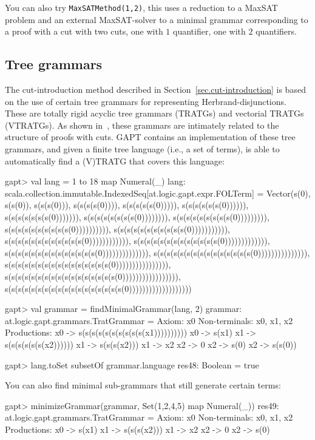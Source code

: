 \documentclass[a4paper,11pt]{article}
\begin{document}
You can also try \texttt{MaxSATMethod(1,2)}, this uses a reduction to a MaxSAT
problem and an external MaxSAT-solver to a
minimal grammar corresponding to a proof with a cut with two cuts, one with $1$
quantifier, one with $2$ quantifiers.

\subsection{Tree grammars}

The cut-introduction method described in Section~\ref{sec.cut-introduction} is
based on the use of certain tree grammars for representing Herbrand-disjunctions.
These are totally rigid acyclic tree grammars (TRATGs) and vectorial TRATGs (VTRATGs).
As shown in~\cite{Hetzl14Algorithmic}, these grammars are intimately related to
the structure of proofs with cuts.  GAPT contains an implementation of
these tree grammars, and given a finite tree language (i.e., a set of terms), is
able to automatically find a (V)TRATG that covers this language:

\begin{clilisting}
gapt> val lang = 1 to 18 map { Numeral(_) }
lang: scala.collection.immutable.IndexedSeq[at.logic.gapt.expr.FOLTerm] = Vector(s(0), s(s(0)), s(s(s(0))), s(s(s(s(0)))), s(s(s(s(s(0))))), s(s(s(s(s(s(0)))))), s(s(s(s(s(s(s(0))))))), s(s(s(s(s(s(s(s(0)))))))), s(s(s(s(s(s(s(s(s(0))))))))), s(s(s(s(s(s(s(s(s(s(0)))))))))), s(s(s(s(s(s(s(s(s(s(s(0))))))))))), s(s(s(s(s(s(s(s(s(s(s(s(0)))))))))))), s(s(s(s(s(s(s(s(s(s(s(s(s(0))))))))))))), s(s(s(s(s(s(s(s(s(s(s(s(s(s(0)))))))))))))), s(s(s(s(s(s(s(s(s(s(s(s(s(s(s(0))))))))))))))), s(s(s(s(s(s(s(s(s(s(s(s(s(s(s(s(0)))))))))))))))), s(s(s(s(s(s(s(s(s(s(s(s(s(s(s(s(s(0))))))))))))))))), s(s(s(s(s(s(s(s(s(s(s(s(s(s(s(s(s(s(0)))))))))))))))))))

gapt> val grammar = findMinimalGrammar(lang, 2)
grammar: at.logic.gapt.grammars.TratGrammar =
Axiom: x0
Non-terminals: x0, x1, x2
Productions:
  x0 -> s(s(s(s(s(s(s(s(s(s(x1))))))))))
  x0 -> s(x1)
  x1 -> s(s(s(s(s(s(x2))))))
  x1 -> s(s(s(x2)))
  x1 -> x2
  x2 -> 0
  x2 -> s(0)
  x2 -> s(s(0))

gapt> lang.toSet subsetOf grammar.language
res48: Boolean = true

\end{clilisting}

You can also find minimal sub-grammars that still generate certain terms:
\begin{clilisting}
gapt> minimizeGrammar(grammar, Set(1,2,4,5) map {Numeral(_)})
res49: at.logic.gapt.grammars.TratGrammar =
Axiom: x0
Non-terminals: x0, x1, x2
Productions:
  x0 -> s(x1)
  x1 -> s(s(s(x2)))
  x1 -> x2
  x2 -> 0
  x2 -> s(0)

\end{clilisting}
\end{document}

